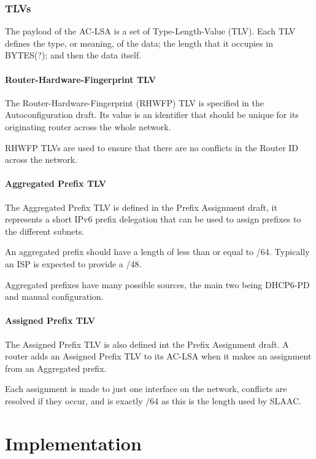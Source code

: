 \documentclass[12pt]{report}
\begin{document}
\subsection{TLVs}
The payload of the AC-LSA is a set of Type-Length-Value (TLV). Each TLV
defines the type, or meaning, of the data; the length that it occupies in
BYTES(?); and then the data itself. 

\subsubsection{Router-Hardware-Fingerprint TLV}
The Router-Hardware-Fingerprint (RHWFP) TLV is specified in the
Autoconfiguration draft. Its value is an identifier that should be unique for
its originating router across the whole network. 

RHWFP TLVs are used to ensure that there are no conflicts in the Router ID
across the network.

\subsubsection{Aggregated Prefix TLV}
The Aggregated Prefix TLV is defined in the Prefix Assignment draft, it
represents a short IPv6 prefix delegation that can be used to assign prefixes
to the different subnets. 

An aggregated prefix should have a length of less than or equal to /64.
Typically an ISP is expected to provide a /48.

Aggregated prefixes have many possible sources, the main two being DHCP6-PD and
manual configuration. 

\subsubsection{Assigned Prefix TLV}
The Assigned Prefix TLV is also defined int the Prefix Assignment draft. A
router adds an Assigned Prefix TLV to its AC-LSA when it makes an assignment
from an Aggregated prefix.  

Each assignment is made to just one interface on the network, conflicts are
resolved if they occur, and is exactly /64 as this is the length used by SLAAC.

\chapter{Implementation}
\end{document}

